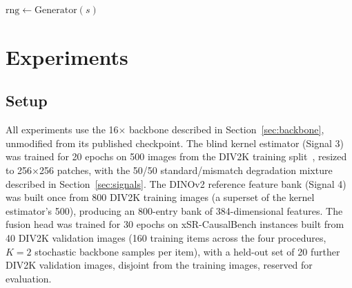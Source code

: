 \documentclass[review]{elsarticle}
\begin{document}
\begin{algorithm}[h]
\SetAlgoLined
{}
$\mathrm{rng} \gets \mathrm{Generator}(s)$\;
\caption{xSR-CausalBench sample construction}
\label{alg:benchmark}
\end{algorithm}

\FloatBarrier
\section{Experiments}
\label{sec:experiments}

\subsection{Setup}

All experiments use the 16$\times$ backbone described in Section~\ref{sec:backbone}, unmodified from its published checkpoint. The blind kernel estimator (Signal 3) was trained for 20 epochs on 500 images from the DIV2K training split~\citep{agustsson2017div2k}, resized to 256$\times$256 patches, with the 50/50 standard/mismatch degradation mixture described in Section~\ref{sec:signals}. The DINOv2 reference feature bank (Signal 4) was built once from 800 DIV2K training images (a superset of the kernel estimator's 500), producing an 800-entry bank of 384-dimensional features. The fusion head was trained for 30 epochs on xSR-CausalBench instances built from 40 DIV2K validation images (160 training items across the four procedures, $K=2$ stochastic backbone samples per item), with a held-out set of 20 further DIV2K validation images, disjoint from the training images, reserved for evaluation.
\end{document}
